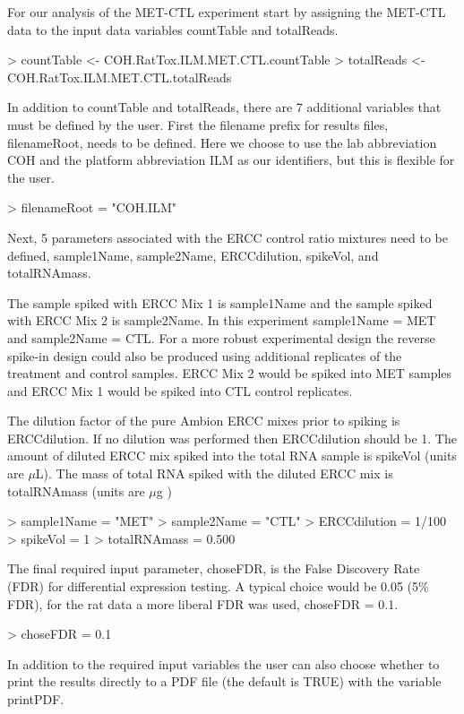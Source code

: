 \documentclass{article}
\begin{document}
For our analysis of the MET-CTL experiment start by assigning the MET-CTL data to the input data variables countTable and totalReads.
\begin{Schunk}
\begin{Sinput}
> countTable <- COH.RatTox.ILM.MET.CTL.countTable
> totalReads <- COH.RatTox.ILM.MET.CTL.totalReads
\end{Sinput}
\end{Schunk}
In addition to countTable and totalReads, there are 7 additional variables that must be defined by the user. First the filename prefix for results files, filenameRoot, needs to be defined. Here we choose to use the lab abbreviation COH and the platform abbreviation ILM as our identifiers, but this is flexible for the user.
\begin{Schunk}
\begin{Sinput}
> filenameRoot = "COH.ILM"
\end{Sinput}
\end{Schunk}
Next, 5 parameters associated with the ERCC control ratio mixtures need to be defined, sample1Name, sample2Name, ERCCdilution, spikeVol, and totalRNAmass.

The sample spiked with ERCC Mix 1 is sample1Name and the sample spiked with ERCC Mix 2 is sample2Name. In this experiment sample1Name = MET and sample2Name = CTL. For a more robust experimental design the reverse spike-in design could also be produced using additional replicates of the treatment and control samples. ERCC Mix 2 would be spiked into MET samples and ERCC Mix 1 would be spiked into CTL control replicates. 

The dilution factor of the pure Ambion ERCC mixes prior to spiking is ERCCdilution. If no dilution was performed then ERCCdilution should be 1. The amount of diluted ERCC mix spiked into the total RNA sample is spikeVol (units are $\mu$L). The mass of total RNA spiked with the diluted ERCC mix is totalRNAmass (units are $\mu$g )
\begin{Schunk}
\begin{Sinput}
> sample1Name = "MET"
> sample2Name = "CTL"
> ERCCdilution = 1/100
> spikeVol = 1
> totalRNAmass = 0.500
\end{Sinput}
\end{Schunk}
The final required input parameter, choseFDR, is the False Discovery Rate (FDR) for differential expression testing. A typical choice would be 0.05 (5\% FDR), for the rat data a more liberal FDR was used, choseFDR = 0.1.
\begin{Schunk}
\begin{Sinput}
> choseFDR = 0.1
\end{Sinput}
\end{Schunk}
In addition to the required input variables the user can also choose whether to print the results directly to a PDF file (the default is TRUE) with the variable printPDF.
\end{document}
